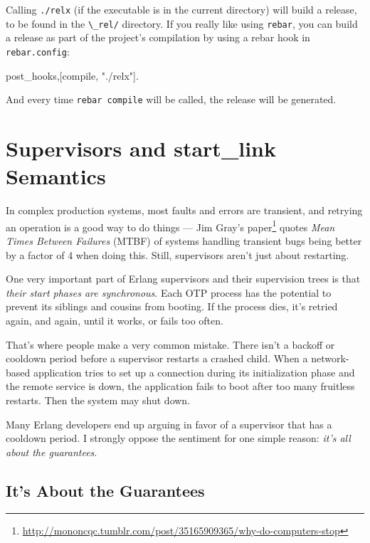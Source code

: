 \documentclass[11pt, oneside]{book}   	%
\newcommand{\filename}[1]{\Verb`#1`}
\newcommand{\app}[1]{\Verb`#1`}
\newcommand{\command}[1]{\Verb`#1`}
\begin{document}
Calling \command{./relx} (if the executable is in the current directory) will build a release, to be found in the \filename{\_rel/} directory. If you really like using \app{rebar}, you can build a release as part of the project's compilation by using a rebar hook in \filename{rebar.config}:

\begin{VerbatimText}
{post_hooks,[{compile, "./relx"}]}.
\end{VerbatimText}

And every time \command{rebar compile} will be called, the release will be generated.

\section{Supervisors and start\_link Semantics}
\label{sec:supervisors-and-start-link-semantics}

In complex production systems, most faults and errors are transient, and retrying an operation is a good way to do things — Jim Gray's paper\footnote{\href{http://mononcqc.tumblr.com/post/35165909365/why-do-computers-stop}{http://mononcqc.tumblr.com/post/35165909365/why-do-computers-stop}} quotes \emph{Mean Times Between Failures} (MTBF) of systems handling transient bugs being better by a factor of 4 when doing this. Still, supervisors aren't just about restarting.

One very important part of Erlang supervisors and their supervision trees is that \emph{their start phases are synchronous}. Each OTP process has the potential to prevent its siblings and cousins from booting. If the process dies, it's retried again, and again, until it works, or fails too often.

That's where people make a very common mistake. There isn't a backoff or cooldown period before a supervisor restarts a crashed child. When a network-based application tries to set up a connection during its initialization phase and the remote service is down, the application fails to boot after too many fruitless restarts. Then the system may shut down.

Many Erlang developers end up arguing in favor of a supervisor that has a cooldown period. I strongly oppose the sentiment for one simple reason: \emph{it's all about the guarantees}.

\subsection{It's About the Guarantees}
\label{subsec:start-link-guarantees}
\end{document}
